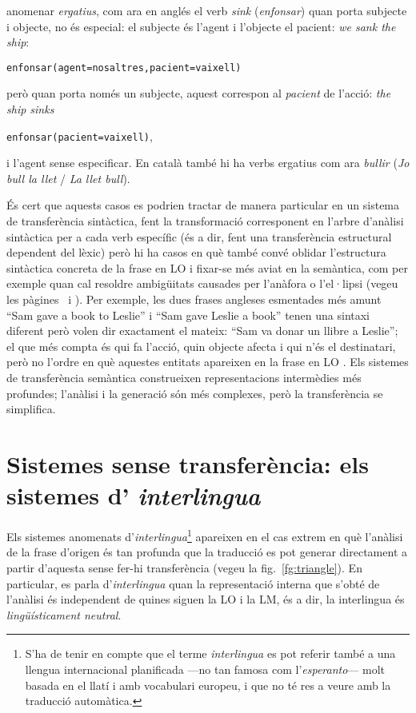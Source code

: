 \begin{itemize}
  anomenar \emph{ergatius}, com ara en anglés el verb \emph{sink}
  (\emph{enfonsar}) quan porta subjecte i objecte, no és especial: el
  subjecte és l'agent i l'objecte el pacient: \emph{we sank the ship}:
  \begin{center}
    \texttt{enfonsar(agent=nosaltres,pacient=vaixell)}
  \end{center}
  però quan porta només un subjecte, aquest correspon al
  \emph{pacient} de l'acció: \emph{the ship sinks}
  \begin{center}
    \texttt{enfonsar(pacient=vaixell)},
  \end{center}
  i l'agent sense especificar. En català també hi
  ha verbs ergatius com ara \emph{bullir} (\emph{Jo bull la llet} /
  \emph{La llet bull}).

\end{itemize}

És cert que aquests casos es podrien tractar de manera particular en
un sistema de transferència sintàctica, fent la transformació
corresponent en l'arbre d'anàlisi sintàctica per a cada verb específic
(és a dir, fent una transferència estructural dependent del lèxic)
però hi ha casos en què també convé oblidar l'estructura sintàctica
concreta de la frase en LO i fixar-se més aviat en la semàntica, com
per exemple quan cal resoldre ambigüitats causades per l'anàfora o
l'el·lipsi (vegeu les pàgines~\pageref{pg:anafora} i
\pageref{pg:ellipsi}).  Per exemple, les dues frases angleses
esmentades més amunt ``Sam gave a book to Leslie'' i ``Sam gave Leslie
a book'' tenen una sintaxi diferent però volen dir exactament el
mateix: ``Sam va donar un llibre a Leslie''; el que més compta és qui
fa l'acció, quin objecte afecta i qui n'és el destinatari, però no
l'ordre en què aquestes entitats apareixen en la frase en LO
\citep{arnold93j}. Els sistemes de transferència semàntica
construeixen representacions intermèdies més profundes; l'anàlisi i la
generació són més complexes, però la transferència se simplifica.

\section[Sistemes sense transferència: interlingua]{Sistemes sense transferència: els sistemes d'{\em
    interlingua}}
\label{ss:interlingua}

Els sistemes anomenats d'\emph{interlingua}\footnote{S'ha de tenir en
  compte que el terme \emph{interlingua} es pot referir també a una
  llengua internacional planificada ---no tan famosa com
  l'\emph{esperanto}--- molt basada en el llatí i amb vocabulari
  europeu, i que no té res a veure amb la traducció automàtica.}
apareixen en el cas extrem en què l'anàlisi de la frase d'origen és
tan profunda que la traducció es pot generar directament a partir
d'aquesta sense fer-hi transferència (vegeu la
fig.~\ref{fg:triangle}). En particular, es parla d'\emph{interlingua}
quan la representació interna que s'obté de l'anàlisi és independent
de quines siguen la LO i la LM, és a dir, la interlingua és {\em
  lingüísticament neutral}.




